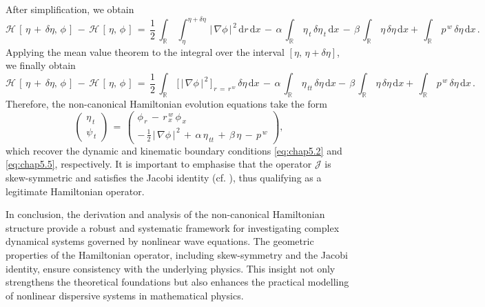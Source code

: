 \documentclass[alpha-refs, 12pt]{wiley-article}
\begin{document}
After simplification, we obtain
\begin{equation*}
  \mathcal{H}\,[\,\eta\,+\,\delta\eta,\,\phi\,]\,-\,\mathcal{H}\,[\,\eta,\,\phi\,]
  \,=\,\frac{1}{2}\,\int_{\mathbb{R}}\,\int_{\eta}^{\eta+\delta\eta}\,|\,\nabla\phi\,|^{\,2}\,\mathrm{d}r\,\mathrm{d}x\,-\,\alpha\,\int_{\mathbb{R}}\,\eta_{\,t}\,\delta\eta_{\,t}\,\mathrm{d}x\,-\,\beta\,\int_{\mathbb{R}}\,\eta\,\delta\eta\,\mathrm{d}x
  +\,\int_{\mathbb{R}}\,p^{\,w}\,\delta\eta\,\mathrm{d}x\,.
\end{equation*}
Applying the mean value theorem to the integral over the interval $[\eta,\,\eta+\delta\eta]$, we finally obtain
\begin{equation*}
  \mathcal{H}\,[\,\eta\,+\,\delta\eta,\,\phi\,]\,-\,\mathcal{H}\,[\,\eta,\,\phi\,]
  \,=\,\frac{1}{2}\,\int_{\mathbb{R}}\,\bigl[\,|\,\nabla\phi\,|^{\,2}\,\bigr]_{\,r\,=\,r^{\,w}}\,\delta\eta\,\mathrm{d}x\,-\,\alpha\,\int_{\mathbb{R}}\,\eta_{\,tt}\,\delta\eta\,\mathrm{d}x
  -\,\beta\,\int_{\mathbb{R}}\,\eta\,\delta\eta\,\mathrm{d}x
  +\,\int_{\mathbb{R}}\,p^{\,w}\,\delta\eta\,\mathrm{d}x\,.
\end{equation*}
Therefore, the non-canonical Hamiltonian evolution equations take the form
\begin{equation}
  \begin{pmatrix}
    \eta_{\,t} \\
    \psi_{\,t}
  \end{pmatrix}
  \,=\,\begin{pmatrix}
    \phi_{\,r}\,-\,r^{\,w}_{\,x}\,\phi_{\,x} \\
    -\,\frac{1}{2}\,|\,\nabla\phi\,|^{\,2}\,+\,\alpha\,\eta_{\,tt}\,+\,\beta\,\eta\,-\,p^{\,w}
  \end{pmatrix},
\end{equation}
which recover the dynamic and kinematic boundary conditions \eqref{eq:chap5.2} and \eqref{eq:chap5.5}, respectively. It is important to emphasise that the operator $\mathcal{J}$ is skew-symmetric and satisfies the Jacobi identity (cf. \citet{Nutku1987}), thus qualifying as a legitimate Hamiltonian operator.

In conclusion, the derivation and analysis of the non-canonical Hamiltonian structure provide a robust and systematic framework for investigating complex dynamical systems governed by nonlinear wave equations. The geometric properties of the Hamiltonian operator, including skew-symmetry and the Jacobi identity, ensure consistency with the underlying physics. This insight not only strengthens the theoretical foundations but also enhances the practical modelling of nonlinear dispersive systems in mathematical physics.
\end{document}
